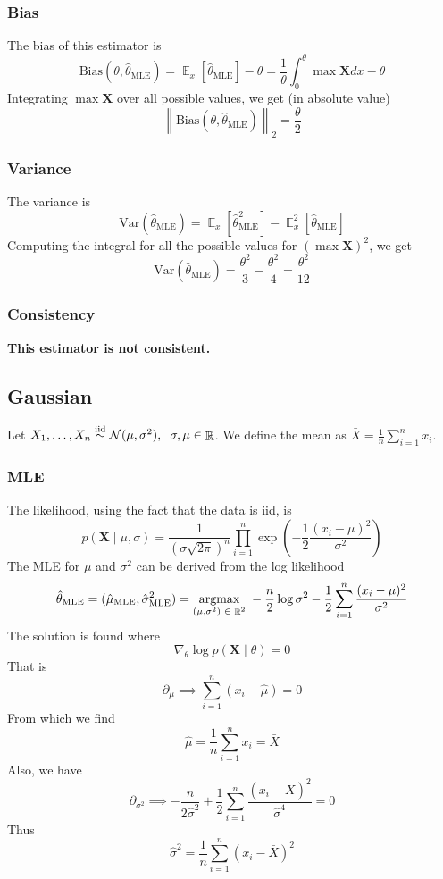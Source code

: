 \documentclass{article}
\DeclareMathOperator{\E}{\mathbb{E}}
\DeclareMathOperator{\R}{\mathbb{R}}
\newcommand{\s}{\hspace{0.1cm}}
\numberwithin{equation}{section}
\newcommand{\norm}[1]{\left\lVert#1\right\rVert_2}
\newcommand{\mle}[1]{\hat{#1}_{\text{MLE}}}
\begin{document}
\subsubsection{Bias}
The bias of this estimator is 
\[
        \text{Bias}(\theta, \mle{\theta}) = \E_x[\mle{\theta}] - \theta 
         = \frac{1}{\theta}\int_0^\theta \max \mathbf{X} dx - \theta
\]
Integrating $\max \mathbf{X}$ over all possible values, we get (in absolute value)
\[
        \boxed{\norm{\text{Bias}(\theta, \mle{\theta})} = \frac{\theta}{2} }
\]


\subsubsection{Variance}
The variance is 
\[
\text{Var}(\mle{\theta}) = \E_x[\mle{\theta}^2] - \E_x^2[\mle{\theta}] 
\]
Computing the integral for all the possible values for $(\max \mathbf{X})^2$, we get 
\[
        \boxed{\text{Var}(\mle{\theta}) = 
        \frac{\theta^2}{3} - \frac{\theta^2}{4} = \frac{\theta^2}{12} }
\]

\subsubsection{Consistency }
\textbf{This estimator is not consistent.}


\subsection{Gaussian}
Let $X_1,\dots,X_n \overset{\text{iid}}{\sim} \mathcal{N}(\mu,\sigma^2),\s  \s
\sigma, \mu \in \R $. We define the mean as $\bar{X} = \frac{1}{n}\sum_{i =1}^n x_i$.

\subsubsection{MLE}
The likelihood, using the fact that the data is iid, is
\[
        p(\mathbf{X} \mid \mu,\sigma) = \frac{1}{ (\sigma \sqrt{2\pi})^n} 
        \prod_{i = 1}^n 
        \exp\left( -\frac{1}{2}\frac{(x_i - \mu)^2}{\sigma^2} \right) 

\]
The MLE for $\mu$ and $\sigma^2$ can be derived from the log likelihood
 \[
         \mle{\theta} = (\mle{\mu}, \mle{\sigma}^2) = 
         \underset{ (\mu, \sigma^2) \s \in \s \R^2}{\text{argmax}} 
                 \s
                 -\frac{n}{2} \log \sigma^2
                 -\frac{1}{2}\sum_{i = 1}^n \frac{(x_i - \mu)^2}{\sigma^2}
\]
The solution is found where
\[
        \nabla_\theta \log p(\mathbf{X} \mid \theta) = 0
\]
That is
\[
        \partial_\mu \implies  \sum_{i = 1}^n (x_i - \hat{\mu}) = 0
\]
From which we find
\[
        \hat{\mu} = \frac{1}{n}\sum_{i = 1}^n x_i = \bar{X}
\]
Also, we have
\[
        \partial_{\sigma^2} \implies -\frac{n}{2\hat{\sigma}^2} + 
        \frac{1}{2}\sum_{i =1}^n \frac{(x_i - \bar{X})^2}{\hat{\sigma}^4} = 0
\]
Thus
\[
        \hat{\sigma}^2 = \frac{1}{n}\sum_{i = 1}^n (x_i - \bar{X})^2 
\]
\end{document}
